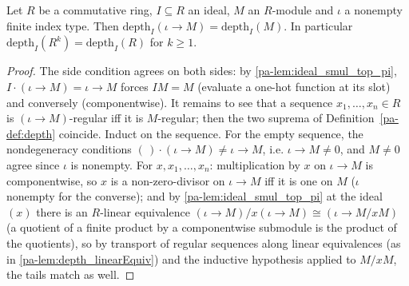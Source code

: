 \begin{lemma}
  \label{pa-lem:depth_pi_const}
  \leanok

  Let \(R\) be a commutative ring, \(I \subseteq R\) an ideal, \(M\) an \(R\)-module and
  \(\iota\) a nonempty finite index type. Then
  \(\mathrm{depth}_I(\iota \to M) = \mathrm{depth}_I(M)\). In particular
  \(\mathrm{depth}_I(R^k) = \mathrm{depth}_I(R)\) for \(k \geq 1\).
\end{lemma}
\begin{proof}
  \leanok
  The side condition agrees on both sides: by \ref{pa-lem:ideal_smul_top_pi},
  \(I \cdot (\iota \to M) = \iota \to M\) forces \(IM = M\) (evaluate a one-hot function
  at its slot) and conversely (componentwise). It remains to see that a sequence
  \(x_1, \dots, x_n \in R\) is \((\iota \to M)\)-regular iff it is \(M\)-regular; then
  the two suprema of Definition~\ref{pa-def:depth} coincide. Induct on the sequence. For
  the empty sequence, the nondegeneracy conditions \((\,)\cdot(\iota \to M) \neq
  \iota \to M\), i.e. \(\iota \to M \neq 0\), and \(M \neq 0\) agree since \(\iota\) is
  nonempty. For \(x, x_1, \dots, x_n\): multiplication by \(x\) on \(\iota \to M\) is
  componentwise, so \(x\) is a non-zero-divisor on \(\iota \to M\) iff it is one on
  \(M\) (\(\iota\) nonempty for the converse); and by \ref{pa-lem:ideal_smul_top_pi} at the
  ideal \((x)\) there is an \(R\)-linear equivalence
  \((\iota \to M)/x(\iota \to M) \cong (\iota \to M/xM)\) (a quotient of a finite
  product by a componentwise submodule is the product of the quotients), so by
  transport of regular sequences along linear equivalences (as in
  \ref{pa-lem:depth_linearEquiv}) and the inductive hypothesis applied to \(M/xM\), the
  tails match as well.
\end{proof}

